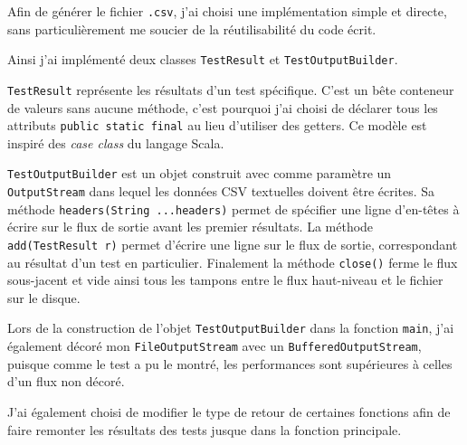 \documentclass[a4paper,11pt]{article}
\begin{document}
Afin de générer le fichier \texttt{.csv}, j'ai choisi une implémentation simple et directe, sans particulièrement me soucier de la réutilisabilité du code écrit.

Ainsi j'ai implémenté deux classes \texttt{TestResult} et \texttt{TestOutputBuilder}.

\texttt{TestResult} représente les résultats d'un test spécifique. C'est un bête conteneur de valeurs sans aucune méthode, c'est pourquoi j'ai choisi de déclarer tous les attributs \texttt{public static final} au lieu d'utiliser des getters. Ce modèle est inspiré des \emph{case class} du langage Scala.

\texttt{TestOutputBuilder} est un objet construit avec comme paramètre un \texttt{OutputStream} dans lequel les données CSV textuelles doivent être écrites. Sa méthode \texttt{headers(String ...headers)} permet de spécifier une ligne d'en-têtes à écrire sur le flux de sortie avant les premier résultats. La méthode \texttt{add(TestResult r)} permet d'écrire une ligne sur le flux de sortie, correspondant au résultat d'un test en particulier. Finalement la méthode \texttt{close()} ferme le flux sous-jacent et vide ainsi tous les tampons entre le flux haut-niveau et le fichier sur le disque.

Lors de la construction de l'objet \texttt{TestOutputBuilder} dans la fonction \texttt{main}, j'ai également décoré mon \texttt{FileOutputStream} avec un \texttt{BufferedOutputStream}, puisque comme le test a pu le montré, les performances sont supérieures à celles d'un flux non décoré.

J'ai également choisi de modifier le type de retour de certaines fonctions afin de faire remonter les résultats des tests jusque dans la fonction principale.
\end{document}
